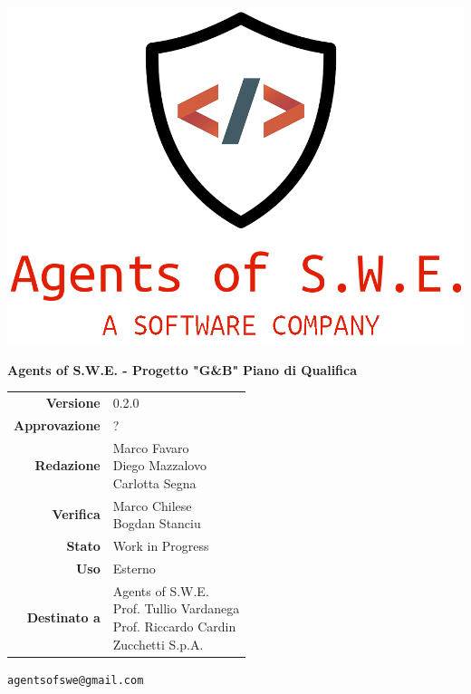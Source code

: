 


\begin{titlepage}
\thispagestyle{empty}

\begin{center}

\includegraphics[scale=0.3]{./images/logo.png} 

\large \textbf{Agents of S.W.E. - Progetto "G\&B"}
\vfill
\Huge \textbf{Piano di Qualifica}
\vfill
\large
\renewcommand{\arraystretch}{1.3}
\begin{tabular}{r|l}
\textbf{Versione} & 0.2.0\\
\textbf{Approvazione} & ?\\
\textbf{Redazione} & \parbox[t]{5cm}{Marco Favaro\\Diego Mazzalovo\\Carlotta Segna}\\
\textbf{Verifica} & \parbox[t]{5cm}{Marco Chilese\\Bogdan Stanciu}\\
\textbf{Stato} & Work in Progress\\
\textbf{Uso} & Esterno\\
\textbf{Destinato a} & \parbox[t]{5cm}{Agents of S.W.E. \\Prof. Tullio Vardanega\\Prof. Riccardo Cardin\\Zucchetti S.p.A.}
\end{tabular}
\vfill
\small
\texttt{agentsofswe@gmail.com}
\end{center}
\end{titlepage}

